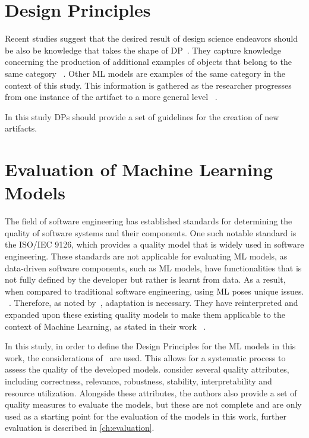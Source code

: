 \section{Design Principles}\label{sec:design-principles}
Recent studies suggest that the desired result of design science endeavors should be also be knowledge that takes the
shape of
\ac{DP}~\cite{baskerville2010explanatory, sein2011action, gregor_positioningpresentingdesign_2013}.
They capture knowledge concerning the production of additional examples of objects that belong to the same
category
~\cite[p. 39]{sein2011action}.
Other ML models are examples of the same category in the context of this study.
This information is gathered as the researcher progresses from one instance of the artifact to a more general level
~\cite[p. 37]{chandra2016making}.

In this study \ac{DP}s should provide a set of guidelines for the creation of new artifacts.


\section{Evaluation of Machine Learning Models}\label{sec:evaluation-of-machine-learning-models}
The field of software engineering has established standards for determining the quality of software systems and their
components.
One such notable standard is the ISO/IEC 9126, which provides a quality model that is widely used in
software engineering.
These standards are not applicable for evaluating \ac{ML} models, as data-driven software components, such
as \ac{ML} models, have functionalities that is not fully defined by the developer but rather is learnt from data.
As a result, when compared to traditional software engineering, using ML poses unique issues.
~\cite[p. 2]{siebert2022construction}.
Therefore, as noted by~\cite{siebert2022construction}, adaptation is necessary.
They have reinterpreted and expanded upon these existing quality models to make them applicable to the context of
Machine Learning, as stated in their work
~\cite[p. 1]{siebert2022construction}.

In this study, in order to define the Design Principles for the \ac{ML} models in this work, the
considerations of~\cite[]{siebert2022construction} are used.
This allows for a systematic process to assess the quality of the developed models.
\cite{siebert2022construction} consider several quality attributes, including
correctness, relevance, robustness, stability, interpretability and resource utilization.
Alongside these attributes, the authors also provide a set of quality measures to evaluate the
models, but these are not complete and are only used as a starting point for the evaluation of the
models in this work, further evaluation is described in \cref{ch:evaluation}.


